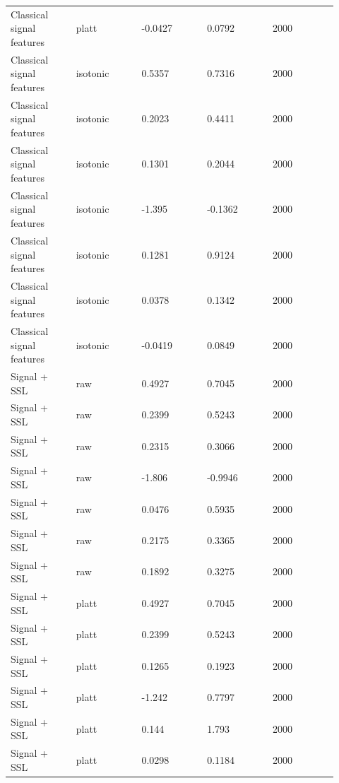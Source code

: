\documentclass[11pt]{article}
\begin{document}
\begin{landscape}
\begin{longtable}{L{0.184\linewidth} L{0.184\linewidth} L{0.184\linewidth} L{0.184\linewidth} L{0.184\linewidth}}
Classical signal features & platt & -\allowbreak{}0.\allowbreak{}0427 & 0.\allowbreak{}0792 & 2000 \\
Classical signal features & isotonic & 0.\allowbreak{}5357 & 0.\allowbreak{}7316 & 2000 \\
Classical signal features & isotonic & 0.\allowbreak{}2023 & 0.\allowbreak{}4411 & 2000 \\
Classical signal features & isotonic & 0.\allowbreak{}1301 & 0.\allowbreak{}2044 & 2000 \\
Classical signal features & isotonic & -\allowbreak{}1.\allowbreak{}395 & -\allowbreak{}0.\allowbreak{}1362 & 2000 \\
Classical signal features & isotonic & 0.\allowbreak{}1281 & 0.\allowbreak{}9124 & 2000 \\
Classical signal features & isotonic & 0.\allowbreak{}0378 & 0.\allowbreak{}1342 & 2000 \\
Classical signal features & isotonic & -\allowbreak{}0.\allowbreak{}0419 & 0.\allowbreak{}0849 & 2000 \\
Signal + SSL & raw & 0.\allowbreak{}4927 & 0.\allowbreak{}7045 & 2000 \\
Signal + SSL & raw & 0.\allowbreak{}2399 & 0.\allowbreak{}5243 & 2000 \\
Signal + SSL & raw & 0.\allowbreak{}2315 & 0.\allowbreak{}3066 & 2000 \\
Signal + SSL & raw & -\allowbreak{}1.\allowbreak{}806 & -\allowbreak{}0.\allowbreak{}9946 & 2000 \\
Signal + SSL & raw & 0.\allowbreak{}0476 & 0.\allowbreak{}5935 & 2000 \\
Signal + SSL & raw & 0.\allowbreak{}2175 & 0.\allowbreak{}3365 & 2000 \\
Signal + SSL & raw & 0.\allowbreak{}1892 & 0.\allowbreak{}3275 & 2000 \\
Signal + SSL & platt & 0.\allowbreak{}4927 & 0.\allowbreak{}7045 & 2000 \\
Signal + SSL & platt & 0.\allowbreak{}2399 & 0.\allowbreak{}5243 & 2000 \\
Signal + SSL & platt & 0.\allowbreak{}1265 & 0.\allowbreak{}1923 & 2000 \\
Signal + SSL & platt & -\allowbreak{}1.\allowbreak{}242 & 0.\allowbreak{}7797 & 2000 \\
Signal + SSL & platt & 0.\allowbreak{}144 & 1.\allowbreak{}793 & 2000 \\
Signal + SSL & platt & 0.\allowbreak{}0298 & 0.\allowbreak{}1184 & 2000 \\

\end{longtable}
\end{landscape}
\end{document}

